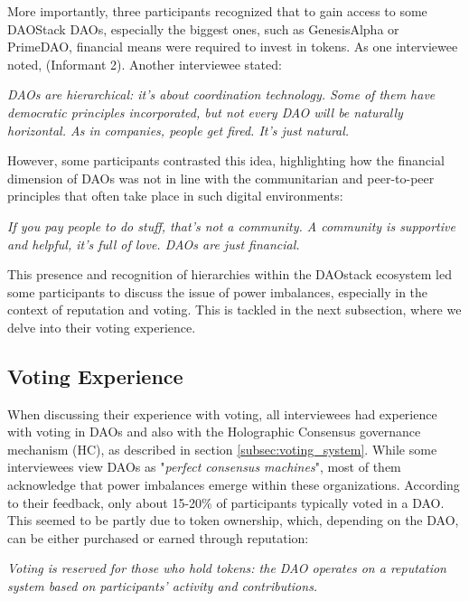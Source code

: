 \documentclass[10pt,lineno]{wlpeerj}
\begin{document}
More importantly, three participants recognized that to gain access to some DAOStack DAOs, especially the biggest ones, such as GenesisAlpha or PrimeDAO, financial means were required to invest in tokens. As one interviewee noted,  (Informant 2). Another interviewee stated:

\begin{displayquote}[Informant 3]
\emph{DAOs are hierarchical: it’s about coordination technology. Some of them have democratic principles incorporated, but not every DAO will be naturally horizontal. As in companies, people get fired. It’s just natural.}
\end{displayquote}

However, some participants contrasted this idea, highlighting how the financial dimension of DAOs was not in line with the communitarian and peer-to-peer principles that often take place in such digital environments:

\begin{displayquote}[Informant 5]
\emph{If you pay people to do stuff, that’s not a community. A community is supportive and helpful, it’s full of love. DAOs are just financial.}
\end{displayquote}

This presence and recognition of hierarchies within the DAOstack ecosystem led some participants to discuss the issue of power imbalances, especially in the context of reputation and voting. This is tackled in the next subsection, where we delve into their voting experience. 

\subsection{Voting Experience}

When discussing their experience with voting, all interviewees had experience with voting in DAOs and also with the Holographic Consensus governance mechanism (HC), as described in section \ref{subsec:voting_system}. While some interviewees view DAOs as "\emph{perfect consensus machines}", most of them acknowledge that power imbalances emerge within these organizations. According to their feedback, only about 15-20\% of participants typically voted in a DAO. This seemed to be partly due to token ownership, which, depending on the DAO, can be either purchased or earned through reputation:

\begin{displayquote}[Informant 1]
\emph{Voting is reserved for those who hold tokens: the DAO operates on a reputation system based on participants' activity and contributions.}
\end{displayquote}
\end{document}
